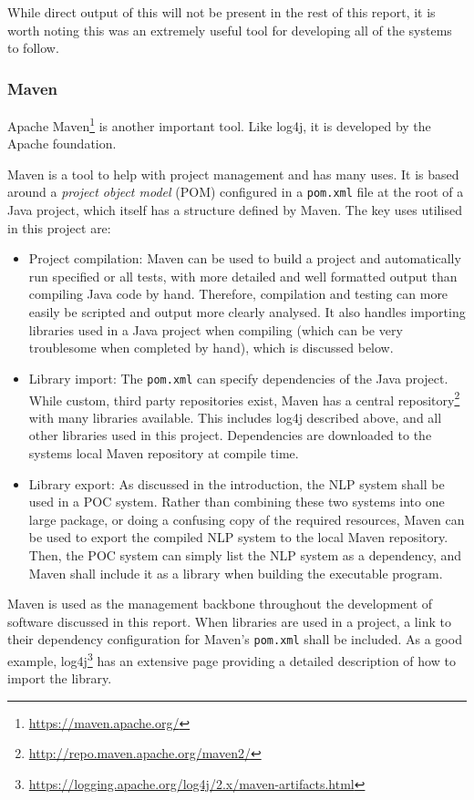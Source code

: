While direct output of this will not be present in the rest of this report, it is worth noting this was an extremely useful tool for developing all of the systems to follow. 

\subsubsection*{Maven}
Apache Maven\footnote{\href{https://maven.apache.org/}{https://maven.apache.org/}} is another important tool. Like log4j, it is developed by the Apache foundation. 

Maven is a tool to help with project management and has many uses. It is based around a \textit{project object model} (POM) configured in a \texttt{pom.xml} file at the root of a Java project, which itself has a structure defined by Maven. The key uses utilised in this project are:
\begin{itemize}
	\item Project compilation: Maven can be used to build a project and automatically run specified or all tests, with more detailed and well formatted output than compiling Java code by hand. Therefore, compilation and testing can more easily be scripted and output more clearly analysed. It also handles importing libraries used in a Java project when compiling (which can be very troublesome when completed by hand), which is discussed below.
	\item Library import: The \texttt{pom.xml} can specify dependencies of the Java project. While custom, third party repositories exist, Maven has a central repository\footnote{\href{http://repo.maven.apache.org/maven2/}{http://repo.maven.apache.org/maven2/}} with many libraries available. This includes log4j described above, and all other libraries used in this project. Dependencies are downloaded to the systems local Maven repository at compile time.
	\item Library export: As discussed in the introduction, the NLP system shall be used in a POC system. Rather than combining these two systems into one large package, or doing a confusing copy of the required resources, Maven can be used to export the compiled NLP system to the local Maven repository. Then, the POC system can simply list the NLP system as a dependency, and Maven shall include it as a library when building the executable program.
\end{itemize}

Maven is used as the management backbone throughout the development of software discussed in this report. When libraries are used in a project, a link to their dependency configuration for Maven's \texttt{pom.xml} shall be included. As a good example, log4j\footnote{\href{https://logging.apache.org/log4j/2.x/maven-artifacts.html}{https://logging.apache.org/log4j/2.x/maven-artifacts.html}} has an extensive page providing a detailed description of how to import the library.

